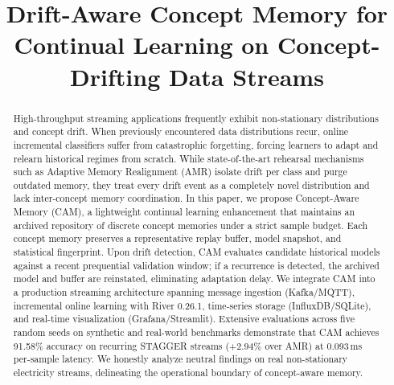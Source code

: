 \documentclass[conference]{IEEEtran}
\begin{document}
\title{Drift-Aware Concept Memory for Continual Learning on Concept-Drifting Data Streams}

\author{
\and
{}
\and
{}
\and
{}
}

\maketitle

\begin{abstract}
High-throughput streaming applications frequently exhibit non-stationary distributions and concept drift. When previously encountered data distributions recur, online incremental classifiers suffer from catastrophic forgetting, forcing learners to adapt and relearn historical regimes from scratch. While state-of-the-art rehearsal mechanisms such as Adaptive Memory Realignment (AMR) isolate drift per class and purge outdated memory, they treat every drift event as a completely novel distribution and lack inter-concept memory coordination. In this paper, we propose Concept-Aware Memory (CAM), a lightweight continual learning enhancement that maintains an archived repository of discrete concept memories under a strict sample budget. Each concept memory preserves a representative replay buffer, model snapshot, and statistical fingerprint. Upon drift detection, CAM evaluates candidate historical models against a recent prequential validation window; if a recurrence is detected, the archived model and buffer are reinstated, eliminating adaptation delay. We integrate CAM into a production streaming architecture spanning message ingestion (Kafka/MQTT), incremental online learning with River 0.26.1, time-series storage (InfluxDB/SQLite), and real-time visualization (Grafana/Streamlit). Extensive evaluations across five random seeds on synthetic and real-world benchmarks demonstrate that CAM achieves 91.58\% accuracy on recurring STAGGER streams (+2.94\% over AMR) at 0.093\,ms per-sample latency. We honestly analyze neutral findings on real non-stationary electricity streams, delineating the operational boundary of concept-aware memory.
\end{abstract}
\end{document}

